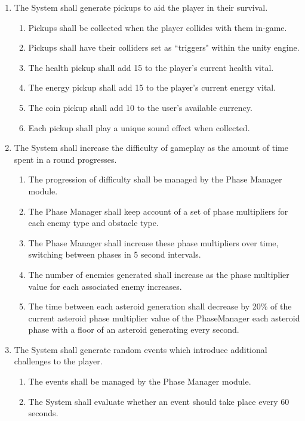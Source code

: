 \documentclass[12pt]{report}
\newenvironment{reqlist}{
	\renewcommand{\labelenumi}{\tab\thesubsection.\arabic{enumi}}
	\renewcommand{\labelenumii}{\thesubsection.\arabic{enumi}.\arabic{enumii}}
	\begin{enumerate}[itemsep = 1pt, parsep = 0pt, leftmargin = *]
}{\end{enumerate}}
\begin{document}
\begin{reqlist}
\begin{reqlist}
				\item Type A Enemies shall attempt to dodge the incoming laser fire from the player.
			\end{reqlist}
			\item The System shall generate pickups to aid the player in their survival.
			\begin{reqlist}
				\item Pickups shall be collected when the player collides with them in-game.
				\item Pickups shall have their colliders set as ``triggers" within the unity engine.
				\item The health pickup shall add 15 to the player's current health vital.
				\item The energy pickup shall add 15 to the player's current energy vital.
				\item The coin pickup shall add 10 to the user's available currency.
				\item Each pickup shall play a unique sound effect when collected.
			\end{reqlist}
			\item The System shall increase the difficulty of gameplay as the amount of time spent in a round progresses.
			\begin{reqlist}
				\item The progression of difficulty shall be managed by the Phase Manager module.
				\item The Phase Manager shall keep account of a set of phase multipliers for each enemy type and obstacle type.
				\item The Phase Manager shall increase these phase multipliers over time, switching between phases in 5 second intervals.
				\item The number of enemies generated shall increase as the phase multiplier value for each associated enemy increases.
				\item The time between each asteroid generation shall decrease by 20\% of the current asteroid phase multiplier value of the PhaseManager each asteroid phase with a floor of an asteroid generating every second.
			\end{reqlist}
			\item The System shall generate random events which introduce additional challenges to the player.
			\begin{reqlist}
				\item The events shall be managed by the Phase Manager module.
				\item The System shall evaluate whether an event should take place every 60 seconds.

\end{reqlist}
\end{reqlist}
\end{document}
